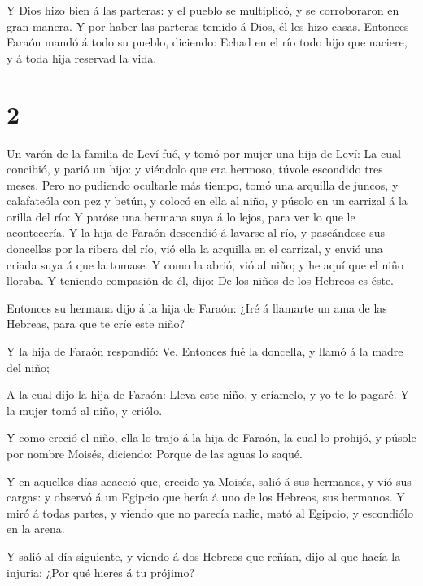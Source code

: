  Y Dios hizo bien á las parteras: y el pueblo se
multiplicó, y se corroboraron en gran manera.  Y por haber
las parteras temido á Dios, él les hizo casas.  Entonces
Faraón mandó á todo su pueblo, diciendo: Echad en el río todo hijo que
naciere, y á toda hija reservad la vida.

\hypertarget{section-1}{%
\section{2}\label{section-1}}

 Un varón de la familia de Leví fué, y tomó por mujer una
hija de Leví:  La cual concibió, y parió un hijo: y viéndolo
que era hermoso, túvole escondido tres meses.  Pero no
pudiendo ocultarle más tiempo, tomó una arquilla de juncos, y
calafateóla con pez y betún, y colocó en ella al niño, y púsolo en un
carrizal á la orilla del río:  Y paróse una hermana suya á
lo lejos, para ver lo que le acontecería.  Y la hija de
Faraón descendió á lavarse al río, y paseándose sus doncellas por la
ribera del río, vió ella la arquilla en el carrizal, y envió una criada
suya á que la tomase.  Y como la abrió, vió al niño; y he
aquí que el niño lloraba. Y teniendo compasión de él, dijo: De los niños
de los Hebreos es éste.

 Entonces su hermana dijo á la hija de Faraón: ¿Iré á
llamarte un ama de las Hebreas, para que te críe este niño?

 Y la hija de Faraón respondió: Ve. Entonces fué la
doncella, y llamó á la madre del niño;

 A la cual dijo la hija de Faraón: Lleva este niño, y
críamelo, y yo te lo pagaré. Y la mujer tomó al niño, y criólo.

 Y como creció el niño, ella lo trajo á la hija de Faraón,
la cual lo prohijó, y púsole por nombre Moisés, diciendo: Porque de las
aguas lo saqué.

 Y en aquellos días acaeció que, crecido ya Moisés, salió á
sus hermanos, y vió sus cargas: y observó á un Egipcio que hería á uno
de los Hebreos, sus hermanos.  Y miró á todas partes, y
viendo que no parecía nadie, mató al Egipcio, y escondiólo en la arena.

 Y salió al día siguiente, y viendo á dos Hebreos que
reñían, dijo al que hacía la injuria: ¿Por qué hieres á tu prójimo?

